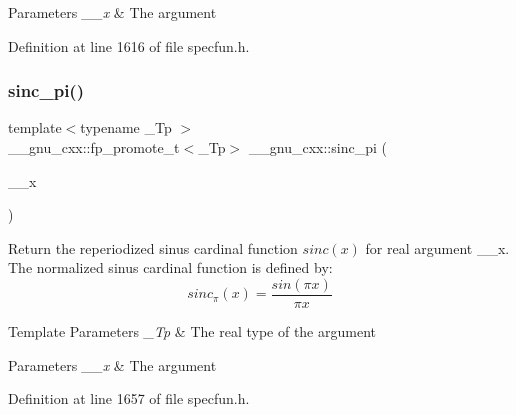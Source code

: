 \begin{DoxyParams}{Parameters}
{\em \+\_\+\+\_\+x} & The argument \\
\hline
\end{DoxyParams}


Definition at line 1616 of file specfun.\+h.

\mbox{\label{group__gnu__math__spec__func_ga5195270024403b985e7d4f2f935f8779}} 
\subsubsection{\texorpdfstring{sinc\+\_\+pi()}{sinc\_pi()}}
{\footnotesize\ttfamily template$<$typename \+\_\+\+Tp $>$ \\
\+\_\+\+\_\+gnu\+\_\+cxx\+::fp\+\_\+promote\+\_\+t$<$\+\_\+\+Tp$>$ \+\_\+\+\_\+gnu\+\_\+cxx\+::sinc\+\_\+pi (\begin{DoxyParamCaption}\item[{\+\_\+\+Tp}]{\+\_\+\+\_\+x }\end{DoxyParamCaption})\hspace{0.3cm}{\ttfamily [inline]}}

Return the reperiodized sinus cardinal function $ sinc(x) $ for real argument {\ttfamily \+\_\+\+\_\+x}. The normalized sinus cardinal function is defined by\+: \[ sinc_\pi(x) = \frac{sin(\pi x)}{\pi x} \]


\begin{DoxyTemplParams}{Template Parameters}
{\em \+\_\+\+Tp} & The real type of the argument \\
\hline
\end{DoxyTemplParams}

\begin{DoxyParams}{Parameters}
{\em \+\_\+\+\_\+x} & The argument \\
\hline
\end{DoxyParams}


Definition at line 1657 of file specfun.\+h.

\mbox{\label{group__gnu__math__spec__func_gad92d43d5332c80d1a27c90bfe3f6417e}} 
